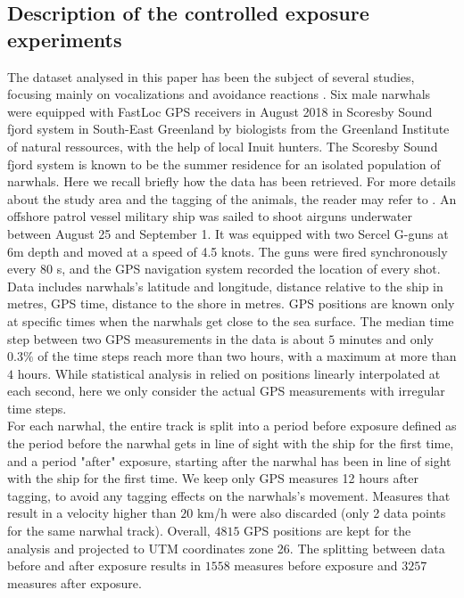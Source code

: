 \documentclass[11pt]{article}
\newcommand {\1}{\mathbb{1}}
\theoremstyle{definition}
\theoremstyle{remark}
\theoremstyle{remark}
\begin{document}
\subsection{Description of the controlled exposure experiments}

The dataset analysed in this paper has been the subject of several studies, focusing mainly on vocalizations and avoidance reactions \cite{heide-jorgensen_behavioral_2021,tervo_narwhals_2021}. 
Six male narwhals were equipped with FastLoc GPS receivers in August 2018 in Scoresby Sound fjord system in South-East Greenland by biologists from the Greenland Institute of natural ressources, with the help of local Inuit hunters. The Scoresby Sound fjord system
is known to be the summer residence for an isolated population of narwhals.
Here we recall briefly how the data has been retrieved. For more details about the study area and the tagging of the animals, the reader may refer to \cite{heide-jorgensen_behavioral_2021}. 
An offshore patrol vessel military ship was sailed to shoot airguns underwater between August 25 and September 1. It was equipped with two Sercel G-guns at 6m depth and moved at a speed of 4.5 knots. The guns were fired synchronously every 80 s, and the GPS navigation system recorded the location of every shot. 
Data includes narwhals's latitude and longitude, distance relative to the ship in metres, GPS time, distance to the shore in metres. GPS positions are known only at specific times when the narwhals get close to the sea surface. The median time step between two GPS measurements in the data is about $5$ minutes and only $0.3 \%$ of the time steps reach more than two hours, with a maximum at more than $4$ hours. While statistical analysis in \cite{heide-jorgensen_behavioral_2021} relied on positions linearly interpolated at each second, here we only consider the actual GPS measurements with irregular time steps.\\




For each narwhal, the entire track is split into a period before exposure defined as the period before the narwhal gets in line of sight with the ship for the first time, and a period "after" exposure, starting after the narwhal has been in line of sight with the ship for the first time. We keep only GPS measures 12 
hours after tagging, to avoid any tagging effects on the narwhals's movement. Measures that result in a velocity higher than $20$ km/h were also discarded (only 2 data points for the same narwhal track).
Overall, $4815$ GPS positions are kept for the analysis and projected to UTM coordinates zone 26. The splitting between data before and after exposure results in $1558$ measures before exposure and $3257$ measures after exposure.
\end{document}
